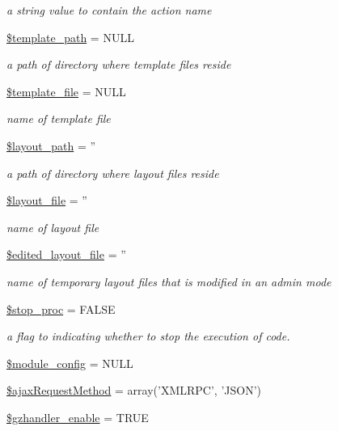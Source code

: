 \begin{DoxyCompactItemize}
\begin{DoxyCompactList}\small\item\em a string value to contain the action name \end{DoxyCompactList}\item 
\hyperlink{classModuleObject_a8a632bae853adef8e2ab9596a3a86661}{\$template\+\_\+path} = N\+U\+L\+L
\begin{DoxyCompactList}\small\item\em a path of directory where template files reside \end{DoxyCompactList}\item 
\hyperlink{classModuleObject_a6eddf08e627527affc7e835a6d302733}{\$template\+\_\+file} = N\+U\+L\+L
\begin{DoxyCompactList}\small\item\em name of template file \end{DoxyCompactList}\item 
\hyperlink{classModuleObject_ada660958e777413d332337fba67d657f}{\$layout\+\_\+path} = ''
\begin{DoxyCompactList}\small\item\em a path of directory where layout files reside \end{DoxyCompactList}\item 
\hyperlink{classModuleObject_a2a1677b06eb7b3ff04ff19e960a64e08}{\$layout\+\_\+file} = ''
\begin{DoxyCompactList}\small\item\em name of layout file \end{DoxyCompactList}\item 
\hyperlink{classModuleObject_a1fcbb01c627ce5ff104c05f54715bd61}{\$edited\+\_\+layout\+\_\+file} = ''
\begin{DoxyCompactList}\small\item\em name of temporary layout files that is modified in an admin mode \end{DoxyCompactList}\item 
\hyperlink{classModuleObject_ad4efa1b4c623247763e4d56f76c5fb1c}{\$stop\+\_\+proc} = F\+A\+L\+S\+E
\begin{DoxyCompactList}\small\item\em a flag to indicating whether to stop the execution of code. \end{DoxyCompactList}\item 
\hyperlink{classModuleObject_aed2cac16f365c2b463772e3eeb0c1402}{\$module\+\_\+config} = N\+U\+L\+L
\item 
\hyperlink{classModuleObject_a783d38cb68310dc6e5a1f6c1cc6c6b84}{\$ajax\+Request\+Method} = array('X\+M\+L\+R\+P\+C', 'J\+S\+O\+N')
\item 
\hyperlink{classModuleObject_acda88247a161a0ddf878e8f504909329}{\$gzhandler\+\_\+enable} = T\+R\+U\+E
\end{DoxyCompactItemize}


